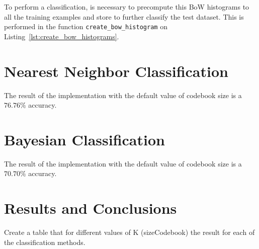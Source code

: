 \documentclass{ethz_report}
\begin{document}


To perform a classification, is necessary to precompute this BoW histograms to all the training examples and store to further classify the test dataset. This is performed in the function \texttt{create\_bow\_histogram} on Listing~\ref{lst:create_bow_histograms}.



\section*{Nearest Neighbor Classification}




The result of the implementation with the default value of codebook size is a $76.76\%$ accuracy.

\section*{Bayesian Classification}



The result of the implementation with the default value of codebook size is a $70.70\%$ accuracy.

\section*{Results and Conclusions}

Create a table that for different values of K (sizeCodebook) the result for each of the classification methods.

%
\end{document}
